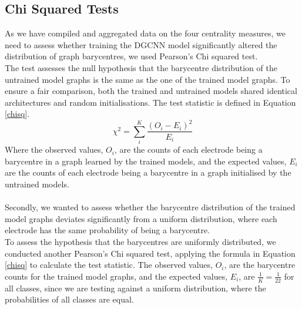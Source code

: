 \subsection{Chi Squared Tests}
As we have compiled and aggregated data on the four centrality measures, we need to assess whether training the DGCNN model significantly altered the distribution of graph barycentres, we used Pearson's Chi squared test. 
\vspace{0.5em}\\
The test assesses the null hypothesis that the barycentre distribution of the untrained model graphs is the same as the one of the trained model graphs. To ensure a fair comparison, both the trained and untrained models shared identical architectures and random initialisations.
The test statistic is defined in Equation \ref{chisq}.
\begin{equation}\label{chisq}
    \chi^2 = \sum_i^K\frac{(O_i - E_i)^2}{E_i}
\end{equation}
Where the observed values, $O_i$, are the counts of each electrode being a barycentre in a graph learned by the trained models, and the expected values, $E_i$ are the counts of each electrode being a barycentre in a graph initialised by the untrained models.
\vspace{0.5em}\\
\vspace{0.5em}\\
Secondly, we wanted to assess whether the barycentre distribution of the trained model graphs deviates significantly from a uniform distribution, where each electrode has the same probability of being a barycentre.
\vspace{0.5em}\\
To assess the hypothesis that the barycentres are uniformly distributed, we conducted another Pearson's Chi squared test, applying the formula in Equation \ref{chisq} to calculate the test statistic. The observed values, $O_i$, are the barycentre counts for the trained model graphs, and the expected values, $E_i$, are $\frac{1}{K} = \frac{1}{22}$ for all classes, since we are testing against a uniform distribution, where the probabilities of all classes are equal.
\vspace{0.5em}\\

